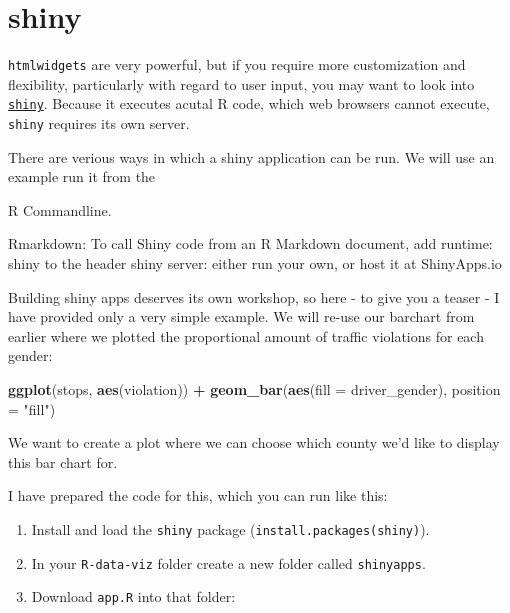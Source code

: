 \documentclass[]{book}
\newenvironment{Shaded}{\begin{snugshade}}{\end{snugshade}}
\newcommand{\DataTypeTok}[1]{\textcolor[rgb]{0.13,0.29,0.53}{#1}}
\newcommand{\KeywordTok}[1]{\textcolor[rgb]{0.13,0.29,0.53}{\textbf{#1}}}
\newcommand{\NormalTok}[1]{#1}
\newcommand{\OperatorTok}[1]{\textcolor[rgb]{0.81,0.36,0.00}{\textbf{#1}}}
\newcommand{\StringTok}[1]{\textcolor[rgb]{0.31,0.60,0.02}{#1}}
\begin{document}
\hypertarget{shiny}{%
\section{shiny}\label{shiny}}

\texttt{htmlwidgets} are very powerful, but if you require more customization and flexibility, particularly with regard to user input, you may want to look into \href{https://CRAN.R-project.org/package=shiny}{\texttt{shiny}}. Because it executes acutal R code, which web browsers cannot execute, \texttt{shiny} requires its own server.

There are verious ways in which a shiny application can be run. We will use an example run it from the

R Commandline.

Rmarkdown: To call Shiny code from an R Markdown document, add runtime: shiny to the header
shiny server: either run your own, or host it at ShinyApps.io

Building shiny apps deserves its own workshop, so here - to give you a teaser - I have provided only a very simple example. We will re-use our barchart from earlier where we plotted the proportional amount of traffic violations for each gender:

\begin{Shaded}
\begin{Highlighting}[]
\KeywordTok{ggplot}\NormalTok{(stops, }\KeywordTok{aes}\NormalTok{(violation)) }\OperatorTok{+}\StringTok{ }
\StringTok{        }\KeywordTok{geom_bar}\NormalTok{(}\KeywordTok{aes}\NormalTok{(}\DataTypeTok{fill =}\NormalTok{ driver_gender), }\DataTypeTok{position =} \StringTok{"fill"}\NormalTok{)}
\end{Highlighting}
\end{Shaded}

We want to create a plot where we can choose which county we'd like to display this bar chart for.

I have prepared the code for this, which you can run like this:

\begin{enumerate}
\def\labelenumi{\arabic{enumi}.}
\item
  Install and load the \texttt{shiny} package (\texttt{install.packages(shiny)}).
\item
  In your \texttt{R-data-viz} folder create a new folder called \texttt{shinyapps}.
\item
  Download \texttt{app.R} into that folder:
\end{enumerate}
\end{document}
